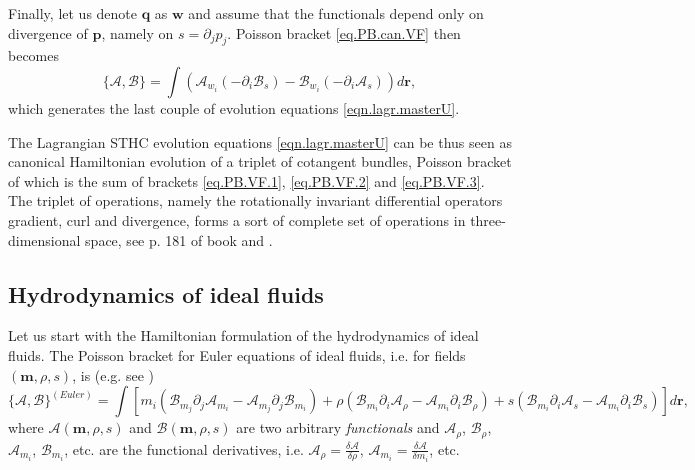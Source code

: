 \documentclass[twoside]{article}
\newcommand{\rr}{{\boldsymbol{r}}}
\newcommand{\ww}{{\boldsymbol{w}}}
\newcommand{\mm}{{\boldsymbol{m}}}
\newcommand{\qq}{{\boldsymbol{q}}}
\newcommand{\pp}{{\boldsymbol{p}}}
\newcommand{\AF}{\mathscr{A}}
\newcommand{\BF}{\mathscr{B}}
\newcommand{\pd}{\partial}
\begin{document}
Finally, let us denote $\qq$ as $\ww$ and assume that the functionals depend only on divergence of $\pp$, namely on $s = \pd_j p_j$. Poisson bracket \eqref{eq.PB.can.VF} then becomes
\begin{equation}\label{eq.PB.VF.3}
\{\AF,\BF\} = \int \left (\AF_{w_i} (-\pd_i \BF_s)-\BF_{w_i} (-\pd_i 
\AF_s)\right ) d\rr,
\end{equation}
which generates the last couple of evolution equations \eqref{eqn.lagr.masterU}. 

The Lagrangian STHC evolution equations \eqref{eqn.lagr.masterU} can be thus 
seen as canonical Hamiltonian evolution of a triplet of cotangent bundles, 
Poisson bracket of which is the sum of brackets \eqref{eq.PB.VF.1}, 
\eqref{eq.PB.VF.2} and \eqref{eq.PB.VF.3}. The triplet of operations, namely 
the rotationally invariant differential operators
gradient, curl and divergence, forms a sort of complete set of operations in 
three-dimensional space, see p. 181 of book \cite{Fecko} and \cite{GodRom1996a}.



\subsection{Hydrodynamics of ideal fluids}
Let us start with the Hamiltonian formulation of the hydrodynamics of ideal 
fluids. The 
Poisson bracket for Euler equations of ideal fluids, i.e. for fields 
$(\mm,\rho,s)$, 
is (e.g. see \cite{Clebsch,Arnold1,MaWe,GPhD,Morrison1998,Pavelka2016})
\begin{equation}\label{eq.PB.CH}
\{\AF,\BF\}^{(Euler)} = \int \left[ m_i(\BF_{m_j} \pd_j \AF_{m_i} - 
\AF_{m_j} 
\pd_j \BF_{m_i}) 
+ 
\rho(\BF_{m_i} \pd_i \AF_\rho - \AF_{m_i} \pd_i \BF_\rho) + s(\BF_{m_i} 
\pd_i \AF_s - 
\AF_{m_i} \pd_i \BF_s) \right] d\rr,
\end{equation}
where $ \AF(\mm,\rho,s) $ and $ \BF(\mm,\rho,s) $ are two arbitrary 
\textit{functionals} and 
$ \AF_\rho $, $ \BF_\rho $, $ \AF_{m_i} $, $ \BF_{m_i} $, etc. are the 
functional 
derivatives, i.e. $ \AF_\rho = \frac{\delta \AF}{\delta \rho}$, $ \AF_{m_i} 
= 
\frac{\delta \AF}{\delta m_i}$, etc.
\end{document}
